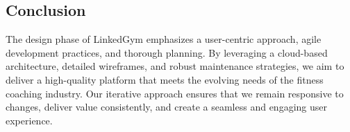 \subsection{Conclusion}
The design phase of LinkedGym emphasizes a user-centric approach, agile development practices, and thorough planning. By leveraging a cloud-based architecture, detailed wireframes, and robust maintenance strategies, we aim to deliver a high-quality platform that meets the evolving needs of the fitness coaching industry. Our iterative approach ensures that we remain responsive to changes, deliver value consistently, and create a seamless and engaging user experience.
